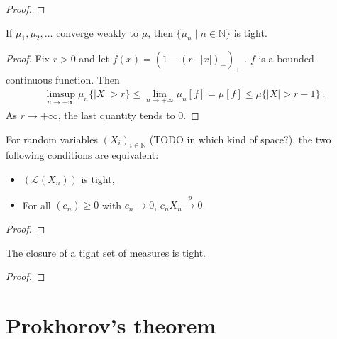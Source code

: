 \begin{proof}\leanok
{}
\end{proof}


\begin{lemma}\label{lem:tight_of_cvg}
If $\mu_1, \mu_2, \ldots$ converge weakly to $\mu$, then $\{\mu_n \mid n \in \mathbb{N}\}$ is tight.
\end{lemma}

\begin{proof}
Fix $r > 0$ and let $f(x) = (1 - (r - \vert x \vert)_+)_+$ . $f$ is a bounded continuous function. Then
\begin{align*}
\limsup_{n \to +\infty} \mu_n\{\vert X \vert > r\}
\le \lim_{n \to +\infty} \mu_n\left[ f \right]
= \mu[f]
\le \mu\{\vert X \vert > r - 1\} \: .
\end{align*}
As $r \to +\infty$, the last quantity tends to 0.
\end{proof}


\begin{lemma}\label{tight_iff_cvg_probability}
For random variables $(X_i)_{i \in \mathbb{N}}$ (TODO in which kind of space?), the two following conditions are equivalent:
\begin{itemize}
	\item $(\mathcal L(X_n))$ is tight,
	\item For all $(c_n) \ge 0$ with $c_n \to 0$, $c_n X_n \xrightarrow{p} 0$.
\end{itemize}
\end{lemma}

\begin{proof}

\end{proof}


\begin{lemma}\label{tight_closure}
The closure of a tight set of measures is tight.
\end{lemma}

\begin{proof}
\end{proof}



\section{Prokhorov's theorem}


